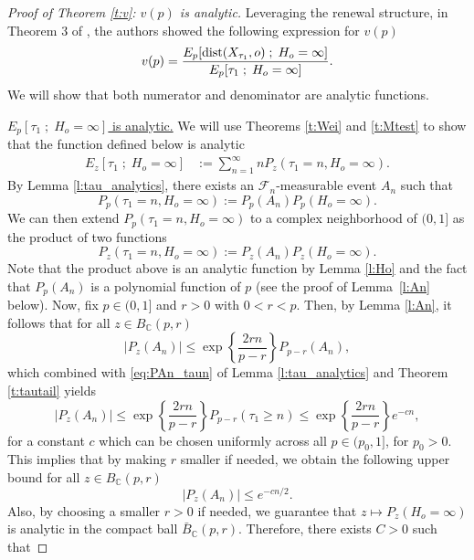 \documentclass[a4paper]{amsart}
\newcommand{\Lbrace}{\left\lbrace}
\newcommand{\Rbrace}{\right\rbrace}
\newcommand{\D}[1]{{\rm dist}(X_{#1},o)}
\begin{document}
\begin{proof}[Proof of Theorem \ref{t:v}: $v(p)$ is analytic] Leveraging the renewal structure, in Theorem 3 of \cite{ribeiro2023}, the authors showed the following expression for $v(p)$
\begin{equation}\label{eq:formulavp}
    v(p) = \frac{E_p[\D{\tau_1} \; ; \; H_o = \infty ]}{E_p[{\tau_1} \; ; \; H_o = \infty ]}.
\end{equation}
We will show that both numerator and denominator are analytic functions.

\noindent \underline{$ E_p[{\tau_1} \; ; \; H_o = \infty ]$ is analytic.}  We will use Theorems \ref{t:Wei} and \ref{t:Mtest} to show that the function defined below is analytic
\begin{equation}\label{eq:Eztau}
    \begin{split}
    E_z[{\tau_1} \; ; \; H_o = \infty ] & := \sum_{n=1}^\infty nP_z(\tau_1 = n,H_o = \infty).
    \end{split}
\end{equation}
By Lemma \ref{l:tau_analytics}, there exists an $\mathcal{F}_n$-measurable event $A_n$ such that
\[
    P_p(\tau_1 = n, H_o = \infty) := P_p(A_n)P_p(H_o = \infty).
\]
We can then extend $P_p(\tau_1 = n, H_o = \infty)$ to a complex neighborhood of $(0,1]$ as the product of two functions
\begin{equation}\label{eq:pztau1n}
    P_z(\tau_1 = n, H_o = \infty) := P_z(A_n)P_z(H_o = \infty).
\end{equation}
Note that the product above is an analytic function by Lemma \ref{l:Ho} and the fact that $P_p(A_n)$ is a polynomial function of $p$ (see the proof of Lemma~\ref{l:An} below). Now, fix $p \in (0,1]$ and $r>0$ with $0 < r < p$. Then, by Lemma \ref{l:An}, it follows that for all $z \in B_{\mathbb{C}}(p,r)$
$$
    |P_z(A_n)| \le \exp\Lbrace\frac{2rn}{p-r}\Rbrace P_{p-r}(A_n),
$$
which combined with \eqref{eq:PAn_taun} of Lemma \ref{l:tau_analytics} and Theorem \ref{t:tautail} yields
$$
    |P_z(A_n)| \le \exp\Lbrace\frac{2rn}{p-r}\Rbrace P_{p-r}(\tau_1 \ge n) \le \exp\Lbrace\frac{2rn}{p-r}\Rbrace e^{-cn},
$$
for a constant $c$ which can be chosen uniformly across all $p \in (p_0,1]$, for $p_0 > 0$. This implies that by making $r$ smaller if needed, we obtain the following upper bound for all $z \in B_{\mathbb{C}}(p,r)$
\begin{equation}
    |P_z(A_n)| \le e^{-cn/2}. 
\end{equation}
Also, by choosing a smaller $r>0$ if needed, we guarantee that $z \mapsto P_z(H_o = \infty)$ is analytic in the compact ball $\bar{B}_{\mathbb{C}}(p,r)$. Therefore, there exists $C > 0$ such that

\end{proof}
\end{document}
